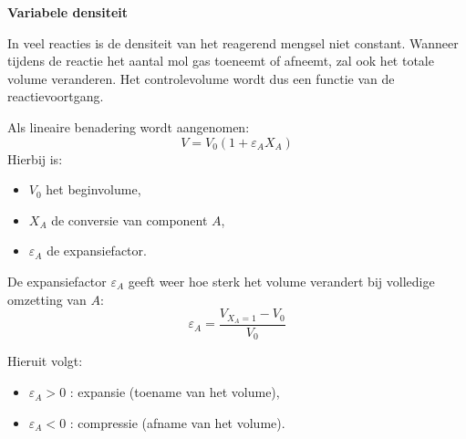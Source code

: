 \documentclass{ximera}
\begin{document}
\begin{image}
\end{image}

\begin{remark} \textbf{Variabele densiteit}

In veel reacties is de densiteit van het reagerend mengsel niet constant. 
Wanneer tijdens de reactie het aantal mol gas toeneemt of afneemt, zal ook het totale volume veranderen. 
Het controlevolume wordt dus een functie van de reactievoortgang.

Als lineaire benadering wordt aangenomen:
\[
V = V_0 (1 + \varepsilon_A X_A)
\]
Hierbij is:
\begin{itemize}
    \item $V_0$ het beginvolume,
    \item $X_A$ de conversie van component $A$,
    \item $\varepsilon_A$ de expansiefactor.
\end{itemize}

De expansiefactor $\varepsilon_A$ geeft weer hoe sterk het volume verandert bij volledige omzetting van $A$:
\[
\varepsilon_A = \frac{V_{X_A=1} - V_0}{V_0}
\]

Hieruit volgt:
\begin{itemize}
    \item $\varepsilon_A > 0$ : expansie (toename van het volume),
    \item $\varepsilon_A < 0$ : compressie (afname van het volume).
\end{itemize}
\end{remark}
\end{document}
